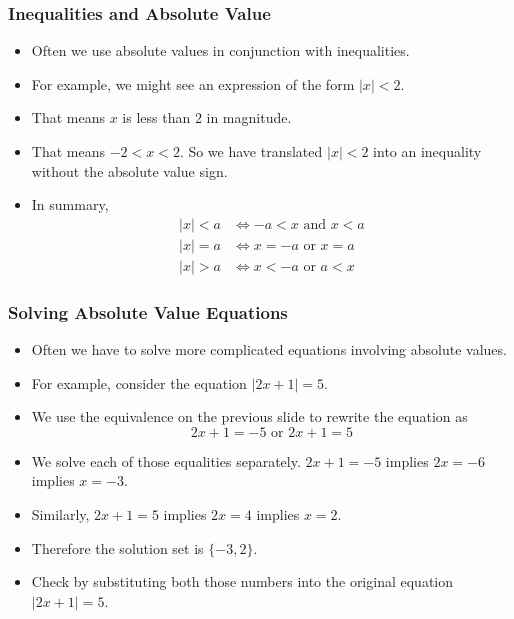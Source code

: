\documentclass[serif,ignorenonframetext]{beamer}
\begin{document}
\begin{frame}
  \frametitle{Inequalities and Absolute Value}
  \begin{itemize}[<+->]
  \item Often we use absolute values in conjunction with inequalities.
  \item For example, we might see an expression of the form $|x|<2$.
  \item That means $x$ is less than $2$ in magnitude.
  \item That means $-2<x<2$.  So we have translated $|x|<2$ into an
    inequality without the absolute value sign.
  \item In summary,
    \begin{align*}
      |x|<a &\Leftrightarrow \mbox{$-a<x$ and $x<a$} \\
      |x|=a &\Leftrightarrow \mbox{$x=-a$ or  $x=a$} \\
      |x|>a &\Leftrightarrow \mbox{$x<-a$ or  $a<x$}
    \end{align*}
  \end{itemize}
\end{frame}

\begin{frame}
  \frametitle{Solving Absolute Value Equations}
  \begin{itemize}[<+->]
  \item Often we have to solve more complicated equations involving
    absolute values.
  \item For example, consider the equation $|2x+1|=5$.
  \item We use the equivalence on the previous slide to rewrite the
    equation as
    \begin{equation*}
      \mbox{$2x+1=-5$ or $2x+1=5$}
    \end{equation*}
  \item We solve each of those equalities separately.  $2x+1=-5$
    implies $2x=-6$ implies $x=-3$.
  \item Similarly, $2x+1=5$ implies $2x=4$ implies $x=2$.
  \item Therefore the solution set is $\{-3,2\}$.
  \item Check by substituting both those numbers into the original
    equation $|2x+1|=5$.
  \end{itemize}
\end{frame}
\end{document}
